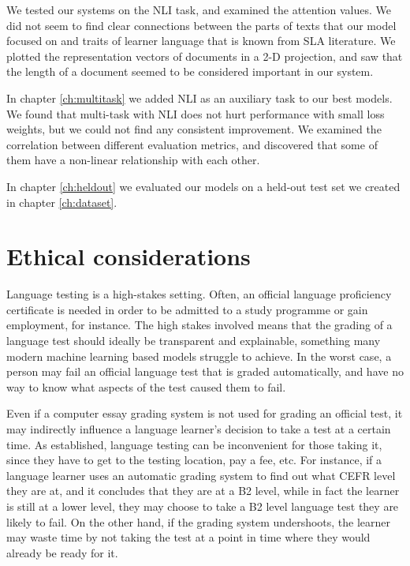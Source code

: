 We tested our systems on the NLI task, and examined the attention values. We
did not seem to find clear connections between the parts of texts that our
model focused on and traits of learner language that is known from \ac{SLA}
literature. We plotted the representation vectors of documents in a 2-D
projection, and saw that the length of a document seemed to be considered
important in our system.

In chapter \ref{ch:multitask} we added \ac{NLI} as an auxiliary task to our
best models. We found that multi-task with NLI does not hurt performance with
small loss weights, but we could not find any consistent improvement. We
examined the correlation between different evaluation metrics, and discovered
that some of them have a non-linear relationship with each other.

In chapter \ref{ch:heldout} we evaluated our models on a held-out test set we
created in chapter \ref{ch:dataset}.


\section{Ethical considerations}

Language testing is a high-stakes setting. Often, an official language
proficiency certificate is needed in order to be admitted to a study
programme or gain employment, for instance. The high stakes involved means
that the grading of a language test should ideally be transparent and
explainable, something many modern machine learning based models struggle to
achieve. In the worst case, a person may fail an official language test that
is graded automatically, and have no way to know what aspects of the test
caused them to fail.

Even if a computer essay grading system is not used for grading an official
test, it may indirectly influence a language learner's decision to take a
test at a certain time. As established, language testing can be inconvenient
for those taking it, since they have to get to the testing location, pay a
fee, etc. For instance, if a language learner uses an automatic grading
system to find out what CEFR level they are at, and it concludes that they
are at a B2 level, while in fact the learner is still at a lower level, they
may choose to take a B2 level language test they are likely to fail. On the
other hand, if the grading system undershoots, the learner may waste time by
not taking the test at a point in time where they would already be ready for
it.

